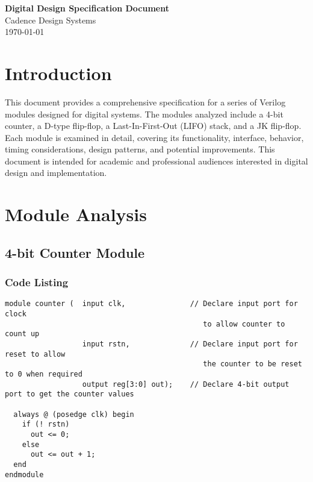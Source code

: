 \documentclass[10pt]{article}
\begin{document}
\begin{center}
    \LARGE \textbf{Digital Design Specification Document} \\
    \vspace{0.5cm}
    \large Cadence Design Systems \\
    \vspace{0.5cm}
    \today
\end{center}

\newpage
\tableofcontents
\newpage

\section{Introduction}

This document provides a comprehensive specification for a series of Verilog modules designed for digital systems. The modules analyzed include a 4-bit counter, a D-type flip-flop, a Last-In-First-Out (LIFO) stack, and a JK flip-flop. Each module is examined in detail, covering its functionality, interface, behavior, timing considerations, design patterns, and potential improvements. This document is intended for academic and professional audiences interested in digital design and implementation.

\section{Module Analysis}

\subsection{4-bit Counter Module}

\subsubsection{Code Listing}
\begin{verbatim}
module counter (  input clk,               // Declare input port for clock 
                                              to allow counter to count up
                  input rstn,              // Declare input port for reset to allow 
                                              the counter to be reset to 0 when required
                  output reg[3:0] out);    // Declare 4-bit output port to get the counter values

  always @ (posedge clk) begin
    if (! rstn)
      out <= 0;
    else
      out <= out + 1;
  end
endmodule
\end{verbatim}
\end{document}
